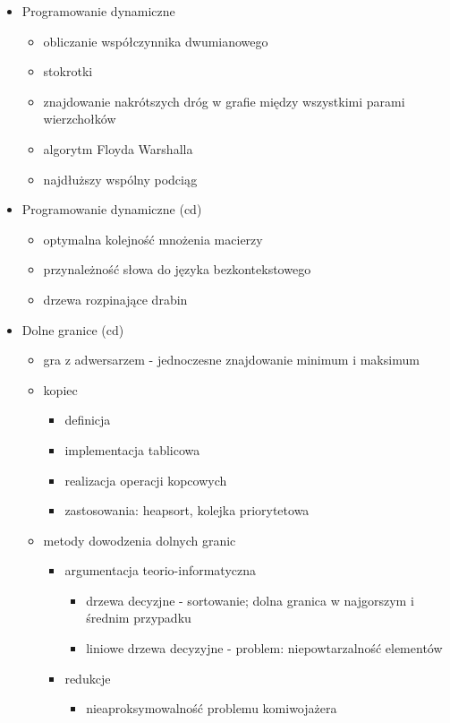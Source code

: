 \begin{itemize}
\item Programowanie dynamiczne
\begin{itemize}
	\item obliczanie współczynnika dwumianowego
	\item stokrotki
	\item znajdowanie nakrótszych dróg w grafie między wszystkimi parami wierzchołków
	\item algorytm Floyda Warshalla
	\item najdłuższy wspólny podciąg
\end{itemize}

\item Programowanie dynamiczne (cd)
\begin{itemize}
	\item optymalna kolejność mnożenia macierzy
	\item przynależność słowa do języka bezkontekstowego
	\item drzewa rozpinające drabin
\end{itemize}

\item Dolne granice (cd)
\begin{itemize}
	\item gra z adwersarzem - jednoczesne znajdowanie minimum i maksimum
	\item kopiec
	\begin{itemize}
		\item definicja
		\item implementacja tablicowa
		\item realizacja operacji kopcowych
		\item zastosowania: heapsort, kolejka priorytetowa
	\end{itemize}
	
	\item metody dowodzenia dolnych granic
	\begin{itemize}
		\item argumentacja teorio-informatyczna
		\begin{itemize}
			\item drzewa decyzjne - sortowanie; dolna granica w najgorszym i średnim przypadku
			\item liniowe drzewa decyzyjne - problem: niepowtarzalność elementów
		\end{itemize}
		\item redukcje 
		\begin{itemize}
			\item nieaproksymowalność problemu komiwojażera
		\end{itemize}
	\end{itemize}
\end{itemize}



\end{itemize}
